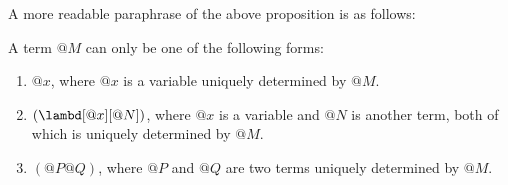 \documentclass[../../../include/open-logic-section]{subfiles}
\begin{document}
A more readable paraphrase of the above proposition is as follows:
\begin{prop}
  A term $@M$ can only be one of the following forms:
  \begin{enumerate}
    \item[\rule{VAR}] $@x$, where $@x$ is a variable uniquely determined by $@M$.
    \item[\rule{ABS}] $(\lambd[@x][@N])$, where $@x$ is a variable and $@N$ is
      another term, both of which is uniquely determined by $@M$.
    \item[\rule{APP}] $(@P@Q)$, where $@P$ and $@Q$ are two terms uniquely
      determined by $@M$.
  \end{enumerate}
\end{prop}
\end{document}
